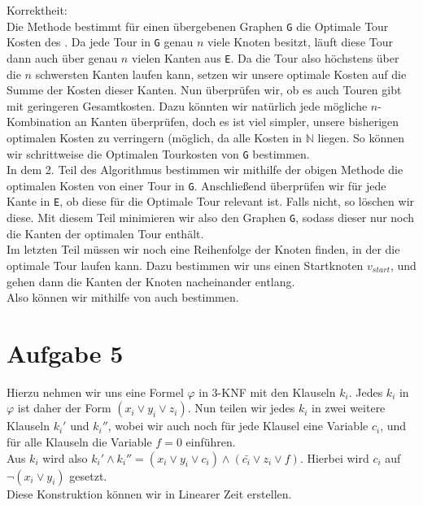 \documentclass[a4paper,11pt]{scrartcl}
\renewcommand{\phi}{\varphi}
\begin{document}
	Korrektheit:\\
	Die Methode bestimmt für einen übergebenen Graphen \verb|G| die Optimale Tour Kosten des . Da jede Tour in \verb|G| genau $n$ viele Knoten besitzt, läuft diese Tour dann auch über genau $n$ vielen Kanten aus \verb|E|. Da die Tour also höchstens über die $n$ schwersten Kanten laufen kann, setzen wir unsere optimale Kosten auf die Summe der Kosten dieser Kanten. Nun überprüfen wir, ob es auch Touren gibt mit geringeren Gesamtkosten. Dazu könnten wir natürlich jede mögliche $n$-Kombination an Kanten überprüfen, doch es ist viel simpler, unsere bisherigen optimalen Kosten zu verringern (möglich, da alle Kosten in $\mathbb{N}$ liegen. So können wir schrittweise die Optimalen Tourkosten von \verb|G| bestimmen.\\
	In dem 2. Teil des Algorithmus bestimmen wir mithilfe der obigen Methode die optimalen Kosten von einer Tour in \verb|G|. Anschließend überprüfen wir für jede Kante in \verb|E|, ob diese für die Optimale Tour relevant ist. Falls nicht, so löschen wir diese. Mit diesem Teil minimieren wir also den Graphen \verb|G|, sodass dieser nur noch die Kanten der optimalen Tour enthält.\\
	Im letzten Teil müssen wir noch eine Reihenfolge der Knoten finden, in der die optimale Tour laufen kann. Dazu bestimmen wir uns einen Startknoten $v_{start}$, und gehen dann die Kanten der Knoten nacheinander entlang.\\
	Also können wir mithilfe von  auch  bestimmen.
	\section*{Aufgabe 5}
	Hierzu nehmen wir uns eine Formel $\phi$ in 3-KNF mit den Klauseln $k_i$.
	Jedes $k_i$ in $\phi$ ist daher der Form $(x_i \lor y_i \lor z_i)$. Nun teilen wir jedes $k_i$ in zwei weitere Klauseln $k_i'$ und $k_i''$, wobei wir auch noch für jede Klausel eine Variable $c_i$, und für alle Klauseln die Variable $f = 0$ einführen.\\
	Aus $k_i$ wird also $k_i' \land k_i'' = (x_i \lor y_i \lor c_i) \land (\bar{c_i} \lor z_i \lor f)$.
	Hierbei wird $c_i$ auf $\neg (x_i \lor y_i)$ gesetzt.\\
	Diese Konstruktion können wir in Linearer Zeit erstellen.\\
	
\end{document}
